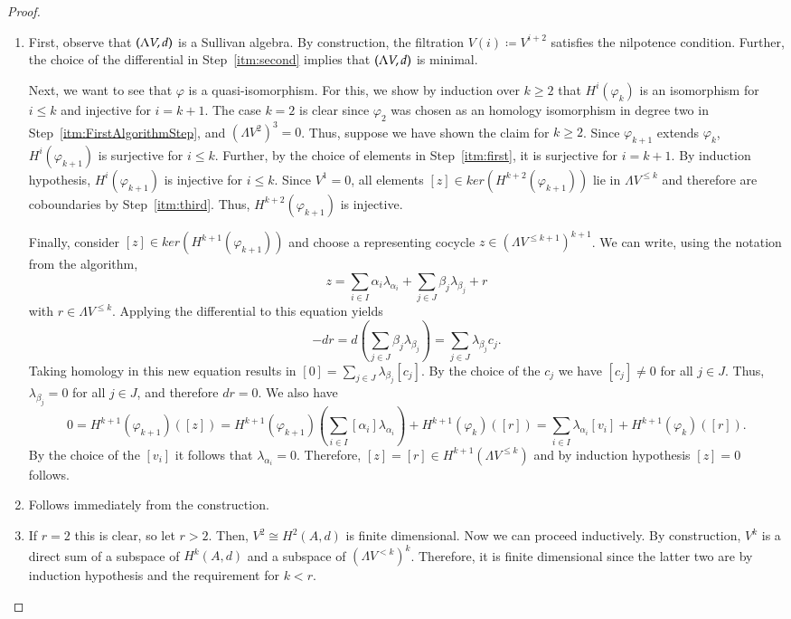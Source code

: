\begin{proof}
\begin{enumerate}
 \item 

 First, observe that $(\Lambda V,d)$ is a Sullivan algebra. By construction, the filtration $V(i) \coloneqq V^{i+2}$ satisfies
 the nilpotence condition. Further, the choice of the differential in Step~\ref{itm:second} 
 implies that $(\Lambda V,d)$ is minimal. 
 
 Next, we want to see that $\varphi$ is a quasi-isomorphism. For this, we show by induction over $k \geq 2$ that
 $H^i(\varphi_k)$ is an isomorphism for $i \leq k$ and injective for $ i = k +1$. The case $k = 2$ is clear since $\varphi_2$ was chosen
 as an homology isomorphism in degree two in Step~\ref{itm:FirstAlgorithmStep}, and ${(\Lambda V^2)}^3 = 0$.
 Thus, suppose we have shown the claim for $k \geq 2$.
 Since $\varphi_{k+1}$ extends $\varphi_{k}$, $H^i(\varphi_{k+1})$ is surjective for $i \leq k$. Further, by the choice
 of elements in Step~\ref{itm:first}, it is surjective for $i = k + 1$.
 By induction hypothesis, $H^i(\varphi_{k + 1})$ is injective  for $i \leq k$.
 Since $V^1 = 0$, all elements $[z] \in ker ( H^{k+2}(\varphi_{k+1}))$ lie in $\Lambda V^{\leq k}$ and therefore are
 coboundaries by Step~\ref{itm:third}. Thus, $H^{k+2}(\varphi_{k+1})$ is injective.
 
 Finally, consider $[z] \in ker ( H^{k+1} (\varphi_{k+1}))$ and choose a representing cocycle $z \in (\Lambda V^{\leq k+1})^{k+1} $.
 We can write, using the notation from
 the algorithm,
 $$z = \sum_{i \in I} \alpha_i \lambda_{\alpha_i} + \sum_{j \in J} \beta_j \lambda_{\beta_j} + r$$
 with $r \in \Lambda V^{ \leq k}$.
 Applying the differential to this equation yields
 $$ -dr = d(\sum_{j \in J} \beta_j \lambda_{\beta_j}) = \sum_{j \in J} \lambda_{\beta_j} c_j.$$
 Taking homology in this new equation results in $ [0] = \sum_{j \in J} \lambda_{\beta_j} [c_j]$.
 By the choice of the $c_j$ we have
 $[c_j] \neq 0$ for all $j \in J$. Thus, $\lambda_{\beta_j} = 0$ for all $j \in J$, and 
 therefore $dr = 0$. We also have
 $$0 = H^{k+1}(\varphi_{k+1})([z]) = H^{k+1}(\varphi_{k+1})( \sum_{i \in I} [\alpha_i] \lambda_{\alpha_i} ) 
 + H^{k+1}(\varphi_k)([r])
    = \sum_{i \in I} \lambda_{\alpha_i} [v_i] + H^{k+1}(\varphi_{k})([r]) .$$   
 By the choice of the $[v_i]$ it follows that $\lambda_{\alpha_i} = 0$. Therefore, 
 $ [z] = [r] \in H^{k+1} (\Lambda V^{\leq k})$ and by induction hypothesis $[z] = 0$ follows.

 \item Follows immediately from the construction.
 \item If $r=2$ this is clear, so let $r > 2$. Then, $V^2 \cong H^2(A,d)$ is finite dimensional. Now we can proceed inductively. 
 By construction, $V^k$ is a
 direct sum of a subspace of $H^k(A,d)$ and a subspace of $(\Lambda V^{ <k })^k$. Therefore, it is finite dimensional since
 the latter two are by induction hypothesis and the requirement for $k<r$.
 \end{enumerate}
\end{proof}


